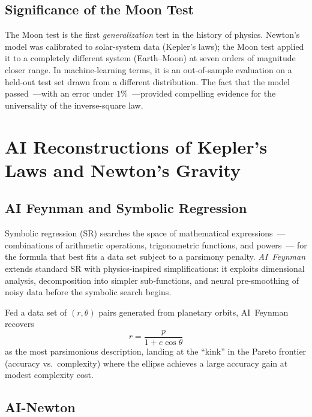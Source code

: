 \documentclass[12pt]{article}
\begin{document}
\subsection{Significance of the Moon Test}

The Moon test is the first \emph{generalization} test in the history of
physics.  Newton's model was calibrated to solar-system data (Kepler's laws);
the Moon test applied it to a completely different system (Earth--Moon) at
seven orders of magnitude closer range.
In machine-learning terms, it is an out-of-sample evaluation on a held-out
test set drawn from a different distribution.
The fact that the model passed~---with an error under $1\%$~---provided
compelling evidence for the universality of the inverse-square law.

\section{AI Reconstructions of Kepler's Laws and Newton's Gravity}
\label{sec:ai}

\subsection{AI Feynman and Symbolic Regression}

Symbolic regression (SR) searches the space of mathematical expressions~---
combinations of arithmetic operations, trigonometric functions, and powers~---
for the formula that best fits a data set subject to a parsimony penalty.
\textit{AI~Feynman} \citep{Udrescu2020} extends standard SR with
physics-inspired simplifications: it exploits dimensional analysis,
decomposition into simpler sub-functions, and neural pre-smoothing of noisy
data before the symbolic search begins.

Fed a data set of $(r,\theta)$ pairs generated from planetary orbits,
AI~Feynman recovers
\[
  r = \frac{p}{1+e\cos\theta}
\]
as the most parsimonious description, landing at the ``kink'' in the
Pareto frontier (accuracy vs.\ complexity) where the ellipse achieves
a large accuracy gain at modest complexity cost.

\subsection{AI-Newton}
\end{document}
